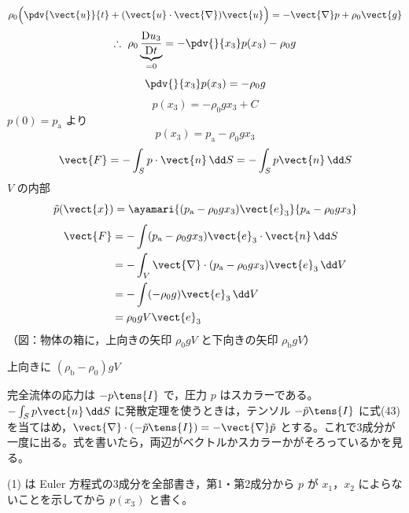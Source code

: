 \[ \rho_{0}\Bigl(\pdv{\vect{u}}{t}+(\vect{u}\cdot\vect{\nabla})\vect{u}\Bigr)=-\vect{\nabla}p+\rho_{0}\vect{g} \]
\[ \therefore\ \rho_{0}\underbrace{\frac{\mathrm{D}u_{3}}{\mathrm{D}t}}_{=0}=-\pdv{}{x_{3}}p(x_{3})-\rho_{0}g \]
\[ \pdv{}{x_{3}}p(x_{3})=-\rho_{0}g \]
\[ p(x_{3})=-\rho_{0}gx_{3}+C \]
$p(0)=p_{\mathrm{a}}$ より
\[ p(x_{3})=p_{\mathrm{a}}-\rho_{0}gx_{3} \]
\[ \vect{F}=-\int_{S}p\cdot\vect{n}\,\dd S=-\int_{S}p\vect{n}\,\dd S \]
$V$ の内部
\[ \tilde{p}(\vect{x})=\ayamari{(p_{\mathrm{a}}-\rho_{0}gx_{3})\vect{e}_{3}}{p_{\mathrm{a}}-\rho_{0}gx_{3}} \]
\begin{align*}
\vect{F}&=-\int(p_{\mathrm{a}}-\rho_{0}gx_{3})\vect{e}_{3}\cdot\vect{n}\,\dd S\\
&=-\int_{V}\vect{\nabla}\cdot(p_{\mathrm{a}}-\rho_{0}gx_{3})\vect{e}_{3}\,\dd V\\
&=-\int(-\rho_{0}g)\vect{e}_{3}\,\dd V\\
&=\rho_{0}gV\vect{e}_{3}
\end{align*}
（図：物体の箱に，上向きの矢印 $\rho_{0}gV$ と下向きの矢印 $\rho_{\mathrm{b}}gV$）

上向きに $(\rho_{\mathrm{b}}-\rho_{0})gV$
\item 完全流体の応力は $-p\tens{I}$ で，圧力 $p$ はスカラーである。$-\int_{S}p\vect{n}\,\dd S$ に発散定理を使うときは，テンソル $-\tilde{p}\tens{I}$ に式(43) を当てはめ，$\vect{\nabla}\cdot(-\tilde{p}\tens{I})=-\vect{\nabla}\tilde{p}$ とする。これで3成分が一度に出る。式を書いたら，両辺がベクトルかスカラーかがそろっているかを見る。
\item (1) は Euler 方程式の3成分を全部書き，第1・第2成分から $p$ が $x_{1}$，$x_{2}$ によらないことを示してから $p(x_{3})$ と書く。
